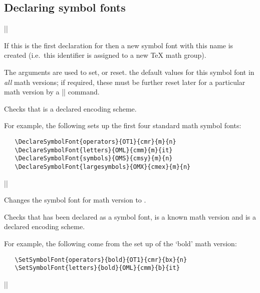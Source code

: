 \documentclass{ltxguide}[1995/11/28]
\begin{document}
\subsection{Declaring symbol fonts}
\label{sec:symalph}

\begin{decl}
  |\DeclareSymbolFont|   
                        
\end{decl}

If this is the first declaration for  then a new symbol font
with this name is created (i.e.~this identifier is assigned to a new
\TeX{} math group).

The arguments     are used to
set, or reset. the default values for this symbol font in \emph{all}
math versions; if required, these must be further reset later for a
particular math version by a |\SetSymbolFont| command.

Checks that  is a declared encoding scheme.

For example, the following sets up the first four standard math symbol
fonts:
\begin{verbatim}
   \DeclareSymbolFont{operators}{OT1}{cmr}{m}{n}
   \DeclareSymbolFont{letters}{OML}{cmm}{m}{it}
   \DeclareSymbolFont{symbols}{OMS}{cmsy}{m}{n}
   \DeclareSymbolFont{largesymbols}{OMX}{cmex}{m}{n}
\end{verbatim}

\begin{decl}
  |\SetSymbolFont|  \\
       \null\hfill {}   
\end{decl}

Changes the symbol font  for math version  to
   .

Checks that  has been declared as a symbol font, 
is a known math version and  is a declared encoding scheme.

For example, the following come from the set up of the `bold' math
version:
\begin{verbatim}
   \SetSymbolFont{operators}{bold}{OT1}{cmr}{bx}{n}
   \SetSymbolFont{letters}{bold}{OML}{cmm}{b}{it}
\end{verbatim}


\begin{decl}
  |\DeclareSymbolFontAlphabet|  
\end{decl}
\end{document}
